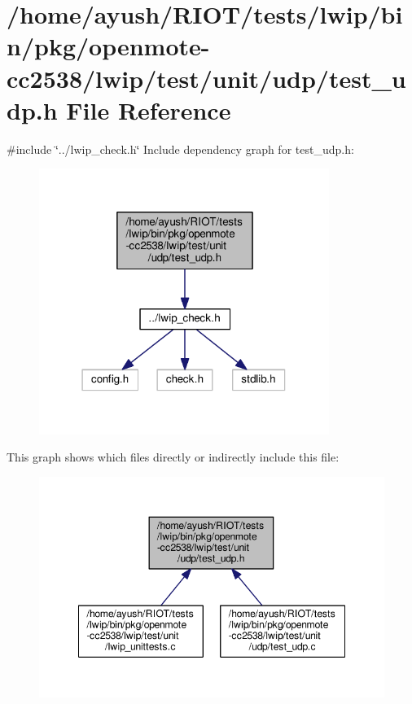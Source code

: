 \hypertarget{openmote-cc2538_2lwip_2test_2unit_2udp_2test__udp_8h}{}\section{/home/ayush/\+R\+I\+O\+T/tests/lwip/bin/pkg/openmote-\/cc2538/lwip/test/unit/udp/test\+\_\+udp.h File Reference}
\label{openmote-cc2538_2lwip_2test_2unit_2udp_2test__udp_8h}
{\ttfamily \#include \char`\"{}../lwip\+\_\+check.\+h\char`\"{}}\newline
Include dependency graph for test\+\_\+udp.\+h\+:
\nopagebreak
\begin{figure}[H]
\begin{center}
\leavevmode
\includegraphics[width=267pt]{openmote-cc2538_2lwip_2test_2unit_2udp_2test__udp_8h__incl}
\end{center}
\end{figure}
This graph shows which files directly or indirectly include this file\+:
\nopagebreak
\begin{figure}[H]
\begin{center}
\leavevmode
\includegraphics[width=348pt]{openmote-cc2538_2lwip_2test_2unit_2udp_2test__udp_8h__dep__incl}
\end{center}
\end{figure}

